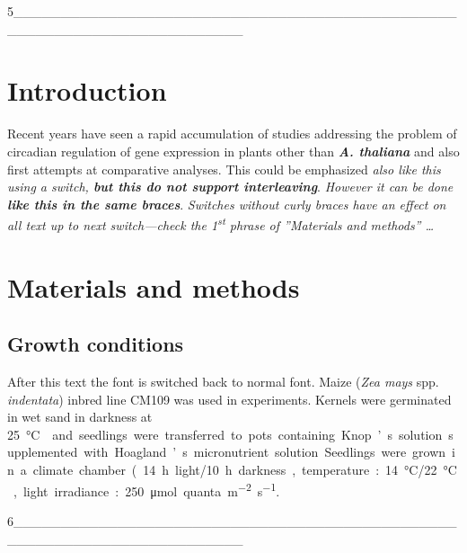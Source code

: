 5________________________________________________________________________

\section{Introduction}
Recent years have seen a rapid accumulation of studies addressing the problem of circadian regulation of gene expression in plants other than \textbf{\textit{A. thaliana}} and also first attempts at comparative analyses. This could be emphasized {\itshape also like this using a switch, {\bfseries but this do not support interleaving}}. {\itshape However it can be done \bfseries like this in the same braces}. \itshape Switches without curly braces have an effect on all text up to next switch---check the 1\textsuperscript{st} phrase of ''Materials and methods'' \ldots{}
\begin{comment}
Pokazane jest zagniezdzanie polecen, switche (np. \textbf i \itshape) nie pozwalaja na zagniezdzanie. (0) Wyproboj polecenie \underline{} i \uppercase{}, co one robia?
\end{comment}

\section{Materials and methods}
\subsection{Growth conditions}

After this text the font is switched back \normalfont to normal font.
Maize (\textit{Zea mays} spp. \textit{indentata}) inbred line CM109 was
used in experiments. Kernels were germinated in wet sand in darkness at \SI{25}\degreeCelsius{} and seedlings were transferred to pots containing Knop’s solution supplemented with Hoagland’s
micronutrient solution. Seedlings were grown in a climate chamber (14  h light/10  h darkness, temperature:
\SI{14}\degreeCelsius/\SI{22}\degreeCelsius, light irradiance: 250 \si{\micro\mole} quanta \si{m^{-2}\s^{-1}}.

6________________________________________________________________________



